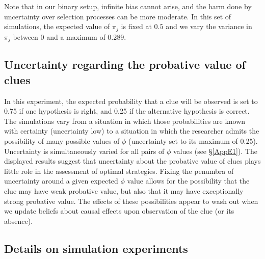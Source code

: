 \documentclass[12pt,]{book}
\begin{document}
Note that in our binary setup, infinite bias cannot arise, and the harm done by uncertainty over selection processes can be more moderate. In this set of simulations, the expected value of \(\pi_j\) is fixed at \(0.5\) and we vary the variance in \(\pi_j\) between 0 and a maximum of 0.289.

\hypertarget{AppE4}{%
\subsection{Uncertainty regarding the probative value of clues}\label{AppE4}}

In this experiment, the expected probability that a clue will be observed is set to 0.75 if one hypothesis is right, and 0.25 if the alternative hypothesis is correct. The simulations vary from a situation in which those probabilities are known with certainty (uncertainty low) to a situation in which the researcher admits the possibility of many possible values of \(\phi\) (uncertainty set to its maximum of 0.25). Uncertainty is simultaneously varied for all pairs of \(\phi\) values (see \S\ref{AppE1}). The displayed results suggest that uncertainty about the probative value of clues plays little role in the assessment of optimal strategies. Fixing the penumbra of uncertainty around a given expected \(\phi\) value allows for the possibility that the clue may have weak probative value, but also that it may have exceptionally strong probative value. The effects of these possibilities appear to wash out when we update beliefs about causal effects upon observation of the clue (or its absence).

\hypertarget{details-on-simulation-experiments}{%
\subsection{Details on simulation experiments}\label{details-on-simulation-experiments}}
\end{document}
